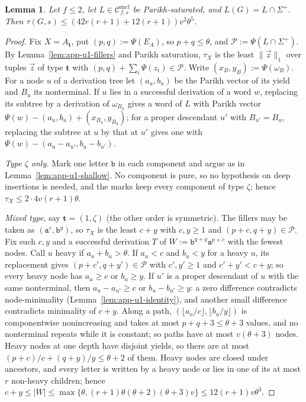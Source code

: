 \documentclass[11pt]{article}
\numberwithin{equation}{section}
\theoremstyle{plain}
\newtheorem{lemma}[theorem]{Lemma}
\theoremstyle{definition}
\theoremstyle{remark}
\newcommand{\Cmcf}[2]{\mathcal{C}^{\mathrm{mcf}}_{#1,#2}}
\newcommand{\tuple}[1]{\vec{#1}}
\begin{document}
\begin{lemma}\label{lem:app-u1-parikh}
Let $f\le2$, let $L\in\Cmcf{f}{s}$ be Parikh-saturated, and
$L(G)=L\cap\Sigma^+$.  Then $\tau(G,s)\le(42r(r+1)+12(r+1))v^2\theta^5$.
\end{lemma}

\begin{proof}
Fix $X=A_{\mathbf t}$, put $(p,q):=\Psi(E_A)$, so $p+q\le\theta$, and
$\mathcal P:=\Psi(L\cap\Sigma^+)$.  By Lemma~\ref{lem:app-u1-fillers} and Parikh
saturation, $\tau_X$ is the least $\|\tuple z\|_1$ over tuples $\tuple z$ of type
$\mathbf t$ with $(p,q)+\sum_i\Psi(z_i)\in\mathcal P$.  Write $(x_B,y_B):=\Psi(\omega_B)$.
For a node $u$ of a derivation tree let $(a_u,b_u)$ be the Parikh vector of its
yield and $B_u$ its nonterminal.  If $u$ lies in a successful derivation of a word
$w$, replacing its subtree by a derivation of $\omega_{B_u}$ gives a word of $L$
with Parikh vector $\Psi(w)-(a_u,b_u)+(x_{B_u},y_{B_u})$; for a proper descendant
$u'$ with $B_{u'}=B_u$, replacing the subtree at $u$ by that at $u'$ gives one
with $\Psi(w)-(a_u-a_{u'},b_u-b_{u'})$.

\emph{Type $\zeta$ only.}  Mark one letter $\mathtt b$ in each component and argue as
in Lemma~\ref{lem:app-u1-shallow}.  No component is pure, so no hypothesis on deep
insertions is needed, and the marks keep every component of type $\zeta$; hence
$\tau_X\le2\cdot4v(r+1)\theta$.

\emph{Mixed type}, say $\mathbf t=(1,\zeta)$ (the other order is symmetric).  The
fillers may be taken as $(\mathtt a^c,\mathtt b^y)$, so $\tau_X$ is the least $c+y$
with $c,y\ge1$ and $(p+c,q+y)\in\mathcal P$.  Fix such $c,y$ and a successful
derivation $T$ of $W:=\mathtt b^{q+y}\mathtt a^{p+c}$ with the fewest nodes.  Call $u$
heavy if $a_u+b_u>\theta$.  If $a_u<c$ and $b_u<y$ for a heavy $u$, its replacement
gives $(p+c',q+y')\in\mathcal P$ with $c',y'\ge1$ and $c'+y'<c+y$; so every heavy
node has $a_u\ge c$ or $b_u\ge y$.  If $u'$ is a proper descendant of $u$ with the
same nonterminal, then $a_u-a_{u'}\ge c$ or $b_u-b_{u'}\ge y$: a zero difference
contradicts node-minimality (Lemma~\ref{lem:app-u1-identity}), and another small
difference contradicts minimality of $c+y$.  Along a path, $(\lfloor a_u/c\rfloor,
\lfloor b_u/y\rfloor)$ is componentwise nonincreasing and takes at most $p+q+3\le
\theta+3$ values, and no nonterminal repeats while it is constant; so paths have
at most $v(\theta+3)$ nodes.  Heavy nodes at one depth have disjoint yields, so
there are at most $(p+c)/c+(q+y)/y\le\theta+2$ of them.  Heavy nodes are closed
under ancestors, and every letter is written by a heavy node or lies in one of its
at most $r$ non-heavy children; hence
$c+y\le|W|\le\max\{\theta,(r+1)\theta(\theta+2)(\theta+3)v\}\le12(r+1)v\theta^3$.


\end{proof}
\end{document}
